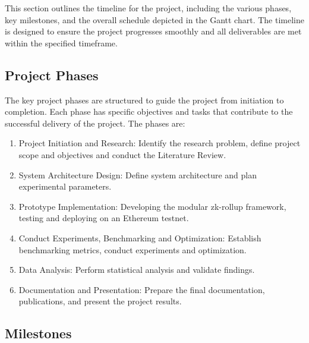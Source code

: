 This section outlines the timeline for the project, including the various phases, key milestones, and the overall schedule depicted in the Gantt chart. The timeline is designed to ensure the project progresses smoothly and all deliverables are met within the specified timeframe.

\vspace{12pt}
\subsection{Project Phases}
\vspace{12pt}

The key project phases are structured to guide the project from initiation to completion. Each phase has specific objectives and tasks that contribute to the successful delivery of the project. The phases are:
\begin{enumerate}
    \item Project Initiation and Research: Identify the research problem, define project scope and objectives and conduct the Literature Review.
    \item System Architecture Design: Define system architecture and plan experimental parameters.
    \item Prototype Implementation: Developing the modular zk-rollup framework, testing and deploying on an Ethereum testnet.
    \item Conduct Experiments, Benchmarking and Optimization: Establish benchmarking metrics, conduct experiments and optimization.
    \item Data Analysis: Perform statistical analysis and validate findings.
    \item Documentation and Presentation: Prepare the final documentation, publications, and present the project results.
\end{enumerate}

\vspace{12pt}
\subsection{Milestones}
\vspace{12pt}


